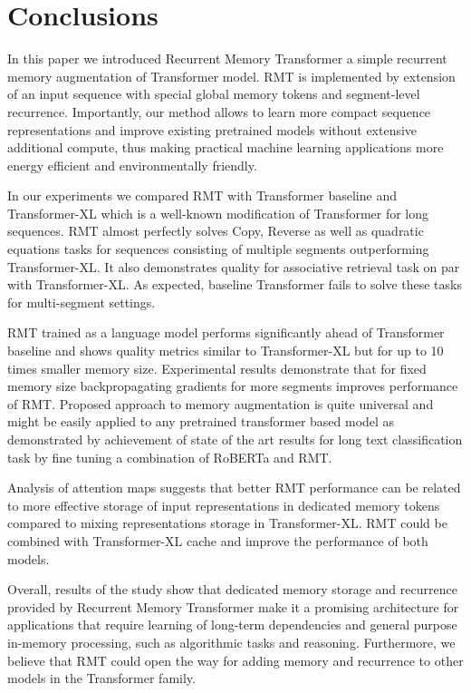   \section{Conclusions}
  
  In this paper we introduced Recurrent Memory Transformer a simple recurrent memory augmentation of Transformer model. RMT is implemented by extension of an input sequence with special global memory tokens and segment-level recurrence. Importantly, our method allows to learn more compact sequence representations and improve existing pretrained models without extensive additional compute, thus making practical machine learning applications more energy efficient and environmentally friendly.
  
  In our experiments we compared RMT with Transformer baseline and Transformer-XL which is a well-known modification of Transformer for long sequences. RMT almost perfectly solves Copy, Reverse as well as quadratic equations tasks for sequences consisting of multiple segments outperforming Transformer-XL. It also demonstrates quality for associative retrieval task on par with Transformer-XL. As expected, baseline Transformer fails to solve these tasks for multi-segment settings.
  
  RMT trained as a language model performs significantly ahead of Transformer baseline and shows quality metrics similar to Transformer-XL but for up to 10 times smaller memory size. Experimental results demonstrate that for fixed memory size backpropagating gradients for more segments improves performance of RMT. Proposed approach to memory augmentation is quite universal and might be easily applied to any pretrained transformer based model as demonstrated by achievement of state of the art results for long text classification task by fine tuning a combination of RoBERTa and RMT.
  
  Analysis of attention maps suggests that better RMT performance can be related to more effective storage of input representations in dedicated memory tokens compared to mixing representations storage in Transformer-XL. RMT could be combined with Transformer-XL cache and improve the performance of both models.
  
  Overall, results of the study show that dedicated memory storage and recurrence provided by Recurrent Memory Transformer make it a promising architecture for applications that require learning of long-term dependencies and general purpose in-memory processing, such as algorithmic tasks and reasoning. Furthermore, we believe that RMT could open the way for adding memory and recurrence to other models in the Transformer family.
  

